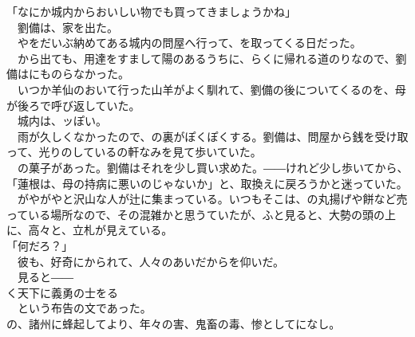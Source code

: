 \documentclass[
  paper=a5,
  fontsize=10pt,
  jafontsize=9.5pt,
  tate,                  %
  open_bracket_pos=nibu, %
]{jlreq}
\begin{document}
「なにか城内からおいしい物でも買ってきましょうかね」\\


　劉備は、家を出た。\\


　やをだいぶ納めてある城内の問屋へ行って、を取ってくる日だった。\\


　から出ても、用達をすまして陽のあるうちに、らくに帰れる道のりなので、劉備はにものらなかった。\\


　いつか羊仙のおいて行った山羊がよく馴れて、劉備の後についてくるのを、母が後ろで呼び返していた。\\


　城内は、ッぽい。\\


　雨が久しくなかったので、の裏がぽくぽくする。劉備は、問屋から銭を受け取って、光りのしているの軒なみを見て歩いていた。\\


　の菓子があった。劉備はそれを少し買い求めた。――けれど少し歩いてから、\\


「蓮根は、母の持病に悪いのじゃないか」と、取換えに戻ろうかと迷っていた。\\


　がやがやと沢山な人が辻に集まっている。いつもそこは、の丸揚げや餅など売っている場所なので、その混雑かと思うていたが、ふと見ると、大勢の頭の上に、高々と、立札が見えている。\\


「何だろ？」\\


　彼も、好奇にかられて、人々のあいだからを仰いだ。\\


　見ると――\\

く天下に義勇の士をる\\



　という布告の文であった。\\

の、諸州に蜂起してより、年々の害、鬼畜の毒、惨としてになし。\\
\end{document}

